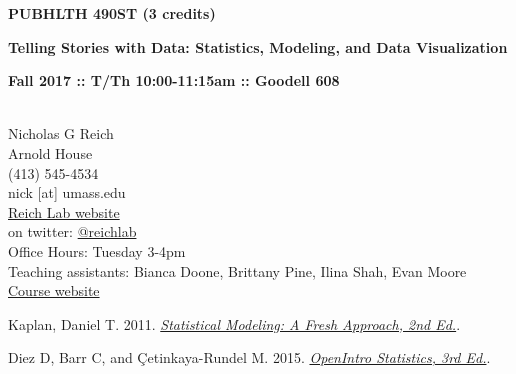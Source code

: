 \documentclass[10pt]{article}
\begin{document}
\centerline{\bf \large PUBHLTH 490ST (3 credits)} 
\centerline{\bf \large Telling Stories with Data: Statistics, Modeling, and Data Visualization}
\centerline{\bf Fall 2017 :: T/Th 10:00-11:15am  :: Goodell 608 }

\vspace{.25in}
\\
\noindent Nicholas G Reich \\
 Arnold House \\
\noindent (413) 545-4534 \\
\noindent nick [at] umass.edu \\
\noindent \href{http://reichlab.github.io}{Reich Lab website}\\
\noindent on twitter: \href{https://twitter.com/reichlab}{@reichlab}\\
\noindent Office Hours: Tuesday 3-4pm \\
\noindent Teaching assistants: Bianca Doone, Brittany Pine, Ilina Shah, Evan Moore \\
\noindent \href{http://nickreich.github.io/data-stories/}{Course website}\\


\bigskip
{}


Kaplan, Daniel T. 2011. \emph{\href{http://www.mosaic-web.org/go/StatisticalModeling/}{Statistical Modeling: A Fresh Approach, 2nd Ed.}}. 
  


  
  
Diez D, Barr C, and \c{C}etinkaya-Rundel M. 2015. \emph{\href{http://www.openintro.org/stat/index.php}{OpenIntro Statistics, 3rd Ed.}}.

\end{document}
